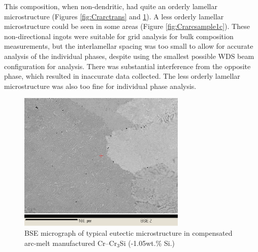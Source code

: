 This composition, when non-dendritic, had quite an orderly lamellar microstructure (Figures \ref{fig:Crarctrans} and \ref{fig:Crarcsample1}).  A less orderly lamellar microstructure could be seen in some areas (Figure \ref{fig:Crarcsample1c}).  These non-directional ingots were suitable for grid analysis for bulk composition measurements, but the interlamellar spacing was too small to allow for accurate analysis of the individual phases, despite using the smallest possible WDS beam configuration for analysis.  There was substantial interference from the opposite phase, which resulted in inaccurate data collected.  The less orderly lamellar microstructure was also too fine for individual phase analysis.

%

\begin{figure}[H]
\begin{center}
\includegraphics[width=8cm]{_Jun18_sample_1_circle_sidei_50um_scale}
\caption{BSE micrograph of typical eutectic microstructure in compensated arc-melt manufactured Cr--Cr$_3$Si (-1.05wt.\% Si.)}
\label{fig:Crarcsample1}
\end{center}
\end{figure}
%
%
%
%

